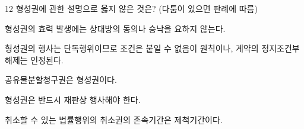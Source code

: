 \begin{question}{12}
형성권에 관한 설명으로 옳지 않은 것은? (다툼이 있으면 판례에 따름)
\begin{choices}
  \item 형성권의 효력 발생에는 상대방의 동의나 승낙을 요하지 않는다.
  \item 형성권의 행사는 단독행위이므로 조건은 붙일 수 없음이 원칙이나, 계약의 정지조건부 해제는 인정된다.
  \item 공유물분할청구권은 형성권이다.
  \item 형성권은 반드시 재판상 행사해야 한다.
  \item 취소할 수 있는 법률행위의 취소권의 존속기간은 제척기간이다.
\end{choices}
\end{question}
